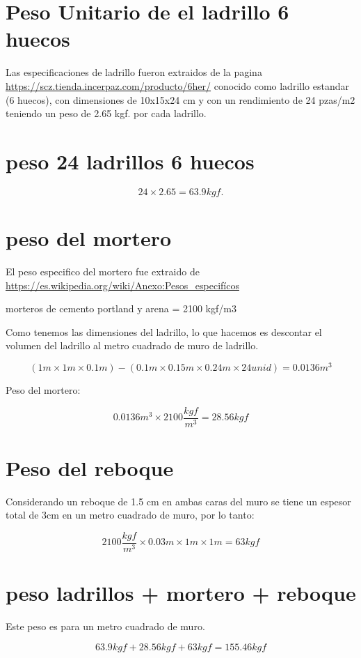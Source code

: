 
\color{white}
\pagecolor{black_background}

\section{Peso Unitario de el ladrillo 6 huecos}

Las especificaciones de ladrillo fueron extraidos de la pagina
\url{https://scz.tienda.incerpaz.com/producto/6her/} conocido como
ladrillo estandar (6 huecos), con dimensiones de 10x15x24 cm
y con un rendimiento de 24 pzas/m2 teniendo un peso de 2.65 kgf.
por cada ladrillo.

\section{peso 24 ladrillos 6 huecos}

$$24 \times 2.65 = 63.9 kgf.$$

\section{peso del mortero}

El peso especifico del mortero fue extraido de
\url{https://es.wikipedia.org/wiki/Anexo:Pesos_especifícos}

morteros de cemento portland y arena = 2100 kgf/m3

Como tenemos las dimensiones del ladrillo, lo que hacemos es descontar
el volumen del ladrillo al metro cuadrado de muro de ladrillo.

$$(1m \times 1m \times 0.1m) - (0.1m \times 0.15m \times 0.24m \times 24unid) = 0.0136m^3$$

Peso del mortero:

$$0.0136m^3 \times 2100 \frac{kgf}{m^3} = 28.56kgf$$

\section{Peso del reboque}

Considerando un reboque de 1.5 cm en ambas caras del muro se tiene un espesor
total de 3cm en un metro cuadrado de muro, por lo tanto:

$$2100 \frac{kgf}{m^3} \times 0.03m \times 1m \times 1m = 63kgf $$

\section{peso ladrillos + mortero + reboque}

Este peso es para un metro cuadrado de muro.

$$63.9kgf + 28.56kgf + 63kgf = 155.46kgf$$


